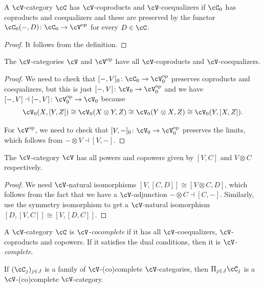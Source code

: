 \documentclass[a4paper,11pt,oneside,openany]{scrbook}
\begin{document}
\begin{prop}
    A $\cV$-category $\cC$ has $\cV$-coproducts and $\cV$-coequalizers if $\cC_0$ has coproducts and coequalizers and these are preserved by the functor $\cC_0(-,D)\colon\cC_0\rightarrow\cV^{\op}$ for every $D\in\cC$.
\end{prop}

\begin{proof}
    It follows from the definition.
\end{proof}

\begin{cor}
    The $\cV$-categories $\cV$ and $\cV^{\op}$ have all $\cV$-coproducts and $\cV$-coequalizers.
\end{cor}

\begin{proof}
    We need to check that $[-,V]_0\colon\cC_0\rightarrow\cV_0^{\op}$ preserves coproducts and coequalizers, but this is just $[-,V]\colon\cV_0\rightarrow\cV_0^{\op}$ and we have $[-,V]\dashv[-,V]\colon\cV_0^{\op}\rightarrow\cV_0$ because
    $$\cV_0(X,[Y,Z])\cong\cV_0(X\otimes Y,Z)\cong\cV_0(Y\otimes X,Z)\cong\cV_0(Y,[X,Z]).$$
    
    For $\cV^{\op}$, we need to check that $[V,-]_0\colon\cV_0\rightarrow\cV_0^{\op}$ preserves the limits, which follows from $-\otimes V\dashv [V,-]$.
\end{proof}

\begin{prop}
    The $\cV$-category $\cV$ has all powers and copowers given by $[V,C]$ and $V\otimes C$ respectively.
\end{prop}

\begin{proof}
    We need $\cV$-natural isomorphisms $[V,[C,D]]\cong[V\otimes C,D]$, which follows from the fact that we have a $\cV$-adjunction $-\otimes C\dashv [C,-]$. Similarly, use the symmetry isomorphism to get a $\cV$-natural isomorphism $[D,[V,C]]\cong[V,[D,C]]$.
\end{proof}

\begin{defn}
    A $\cV$-category $\cC$ is \emph{$\cV$-cocomplete} if it has all $\cV$-coequalizers, $\cV$-coproducts and copowers. If it satisfies the dual conditions, then it is \emph{$\cV$-complete}.
\end{defn}

\begin{exmp}
    If $(\cC_j)_{j\in J}$ is a family of $\cV$-(co)complete $\cV$-categories, then $\Pi_{j\in J}\cC_j$ is a $\cV$-(co)complete $\cV$-category.
\end{exmp}
\end{document}
